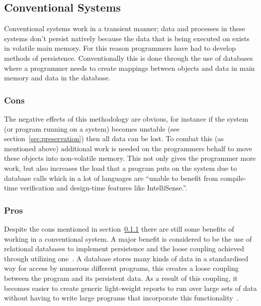 \documentclass[a4paper,12pt]{article}
\begin{document}
\subsection{Conventional Systems}
Conventional systems work in a transient manner; data and processes in these systems don't persist natively because the data that is being executed on exists in volatile main memory. For this reason programmers have had to develop methods of persistence. Conventionally this is done through the use of databases where a programmer needs to create mappings between objects and data in main memory and data in the database.
\subsubsection{Cons}\label{sec:cons}
The negative effects of this methodology are obvious, for instance if the system (or program running on a system) becomes unstable (see section~\ref{sec:preservation}) then all data can be lost. To combat this (as mentioned above) additional work is needed on the programmers behalf to move these objects into non-volatile memory. This not only gives the programmer more work, but also increases the load that a program puts on the system due to database calls which in a lot of languages are ``unable to benefit from compile-time verification and design-time features like IntelliSense.''\citep[p~1]{linqsql}.
\subsubsection{Pros}
Despite the cons mentioned in section~\ref{sec:cons} there are still some benefits of working in a conventional system. A major benefit is considered to be the use of relational databases to implement persistence and the loose coupling achieved through utilizing one~\citep{Databases}.
A database stores many kinds of data in a standardised way for access by numerous different programs, this creates a loose coupling between the program and its persistent data. As a result of this coupling, it becomes easier to create generic light-weight reports to run over large sets of data without having to write large programs that incorporate this functionality~\citep{XML}.
\end{document}
